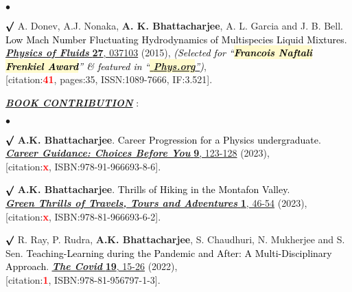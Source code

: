 \documentclass[margin,line]{res}
\newenvironment{list1}{
  \begin{list}{\ding{113}}{%
      \setlength{\itemsep}{0in}
      \setlength{\parsep}{0in} \setlength{\parskip}{0in}
      \setlength{\topsep}{0in} \setlength{\partopsep}{0in} 
      \setlength{\leftmargin}{0.17in}}}{\end{list}}
\newenvironment{list2}{
  \begin{list}{$\bullet$}{%
      \setlength{\itemsep}{0in}
      \setlength{\parsep}{0in} \setlength{\parskip}{0in}
      \setlength{\topsep}{0in} \setlength{\partopsep}{0in} 
      \setlength{\leftmargin}{0.2in}}}{\end{list}}
\begin{document}
\begin{resume}
\begin{list2}
\item[$\pmb\surd$] A. Donev, A.J. Nonaka, {\bf A. K. Bhattacharjee}, A. L. Garcia and J. B. Bell. \textcolor{black}{\textsf{Low Mach Number 
Fluctuating Hydrodynamics of Multispecies Liquid Mixtures}}. \href{http://scitation.aip.org/content/aip/journal/pof2/27/3/10.1063/1.4913571}{\underline{\textit{\textbf{Physics of Fluids}}} {\bf 27}, 037103} (2015), \textcolor{black}{\small \it(Selected for ``\colorbox{lemonchiffon}{\bf Francois Naftali 
Frenkiel Award}'' \& featured in ``\href{http://phys.org/news/2015-03-mathematicians-fluids-mesoscale.html}{\colorbox{lemonchiffon}{\bf 
Phys.org}''})}, \\{[citation:\textcolor{red}{\bf 41}, pages:35, ISSN:1089-7666, IF:3.521]}.
\end{list2}
\vspace{4mm}
\begin{list1}
\item[] \textcolor{alizarin}{\ul{\textbf{\textit{BOOK CONTRIBUTION}}} :}
\end{list1}
\vspace{2mm}
\begin{list2}
\item[$\pmb\surd$] {\bf A.K. Bhattacharjee}. \textcolor{black}{\textsf{Career Progression for a Physics undergraduate}}. 
\\ \href{https://asutoshcollege.in/new-web/images/gallery/CCTP/02.jpg}{\underline{\textit{\textbf{Career Guidance: Choices Before You}}} {\bf 9}, 123-128} (2023), \\ {[citation:\textcolor{red}{\bf x}, ISBN:978-91-966693-8-6]}.
\vspace{2mm}
\item[$\pmb\surd$] {\bf A.K. Bhattacharjee}. \textcolor{black}{\textsf{Thrills of Hiking in the Montafon Valley}}. \\ 
\href{https://amitbny.github.io/akb.github.io/doc/GreenThrills_AKB.pdf}{\underline{\textit{\textbf{Green Thrills of Travels, Tours and Adventures}}} {\bf 1}, 46-54} (2023), \\{[citation:\textcolor{red}{\bf x}, ISBN:978-81-966693-6-2]}.
\vspace{2mm}
\item[$\pmb\surd$] R. Ray, P. Rudra, {\bf A.K. Bhattacharjee}, S. Chaudhuri, N. Mukherjee and S. Sen. \textcolor{black}{\textsf{
Teaching-Learning during the Pandemic and After: A Multi-Disciplinary Approach}}. \href{https://papers.ssrn.com/sol3/papers.cfm?abstract_id=4082658}{\underline{\textit{\textbf{The Covid}}} {\bf 19}, 15-26} (2022),\\ {[citation:\textcolor{red}{\bf 1}, ISBN:978-81-956797-1-3]}.
\end{list2}


\end{resume}
\end{document}
